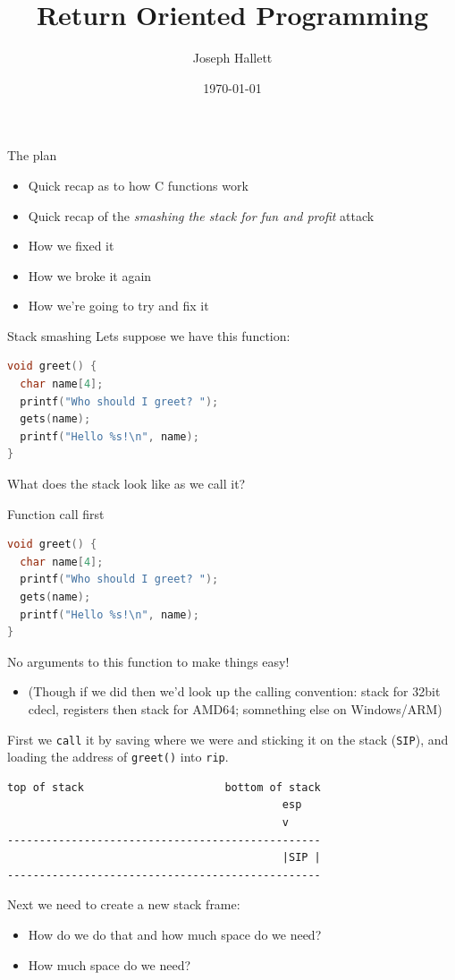 \documentclass[9pt,aspectratio=169]{beamer}
\author{Joseph Hallett}
\date{\today}
\title{Return Oriented Programming}
\begin{document}
\maketitle
\begin{frame}[label={sec:orgdf785c2}]{The plan}
\begin{itemize}
\item Quick recap as to how C functions work
\item Quick recap of the \emph{smashing the stack for fun and profit} attack
\item How we fixed it
\item How we broke it again
\item How we're going to try and fix it
\end{itemize}
\end{frame}
\begin{frame}[label={sec:orga22a296},fragile]{Stack smashing}
 Lets suppose we have this function:

\begin{lstlisting}[language=C,numbers=none]
void greet() {
  char name[4];
  printf("Who should I greet? ");
  gets(name);
  printf("Hello %s!\n", name);
}
\end{lstlisting}

What does the stack look like as we call it?
\end{frame}
\begin{frame}[label={sec:orgc11a0ff},fragile]{Function call first}
 \begin{lstlisting}[language=C,numbers=none]
void greet() {
  char name[4];
  printf("Who should I greet? ");
  gets(name);
  printf("Hello %s!\n", name);
}
\end{lstlisting}

No arguments to this function to make things easy!
\begin{itemize}
\item (Though if we did then we'd look up the calling convention: stack for 32bit cdecl, registers then stack for AMD64; somnething else on Windows/ARM)
\end{itemize}
First we \texttt{call} it by saving where we were and sticking it on the stack (\texttt{SIP}), and loading the address of \texttt{greet()} into \texttt{rip}.

\begin{verbatim}
top of stack                      bottom of stack
                                           esp
                                           v
-------------------------------------------------
                                           |SIP |
-------------------------------------------------
\end{verbatim}

Next we need to create a new stack frame:
\begin{itemize}
\item How do we do that and how much space do we need?
\item How much space do we need?
\end{itemize}
\end{frame}
\end{document}
